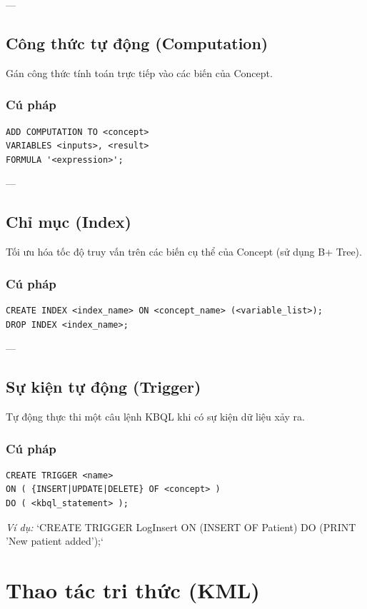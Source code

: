 ---

\subsection{Công thức tự động (Computation)}

Gán công thức tính toán trực tiếp vào các biến của Concept.

\subsubsection{Cú pháp}
\begin{verbatim}
ADD COMPUTATION TO <concept>
VARIABLES <inputs>, <result>
FORMULA '<expression>';
\end{verbatim}

---

\subsection{Chỉ mục (Index)}

Tối ưu hóa tốc độ truy vấn trên các biến cụ thể của Concept (sử dụng B+ Tree).

\subsubsection{Cú pháp}
\begin{verbatim}
CREATE INDEX <index_name> ON <concept_name> (<variable_list>);
DROP INDEX <index_name>;
\end{verbatim}

---

\subsection{Sự kiện tự động (Trigger)}

Tự động thực thi một câu lệnh KBQL khi có sự kiện dữ liệu xảy ra.

\subsubsection{Cú pháp}
\begin{verbatim}
CREATE TRIGGER <name>
ON ( {INSERT|UPDATE|DELETE} OF <concept> )
DO ( <kbql_statement> );
\end{verbatim}
\textit{Ví dụ:} `CREATE TRIGGER LogInsert ON (INSERT OF Patient) DO (PRINT 'New patient added');`

\section{Thao tác tri thức (KML)}

